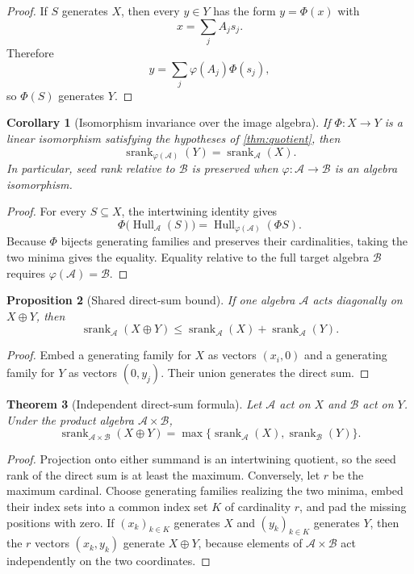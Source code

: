 \documentclass[11pt]{article}
\newtheorem{theorem}{Theorem}[section]
\newtheorem{proposition}[theorem]{Proposition}
\newtheorem{corollary}[theorem]{Corollary}
\theoremstyle{definition}
\theoremstyle{remark}
\newcommand{\cA}{\mathcal A}
\newcommand{\cB}{\mathcal B}
\newcommand{\Hull}{\operatorname{Hull}}
\newcommand{\srank}{\operatorname{srank}}
\begin{document}
\begin{proof}
If $S$ generates $X$, then every $y\in Y$ has the form $y=\Phi(x)$ with
\[
x=\sum_j A_js_j.
\]
Therefore
\[
y=\sum_j\varphi(A_j)\Phi(s_j),
\]
so $\Phi(S)$ generates $Y$.
\end{proof}

\begin{corollary}[Isomorphism invariance over the image algebra]
\label{cor:image-algebra-invariance}
If $\Phi:X\to Y$ is a linear isomorphism satisfying the hypotheses of \cref{thm:quotient}, then
\[
\srank_{\varphi(\cA)}(Y)=\srank_{\cA}(X).
\]
In particular, seed rank relative to $\cB$ is preserved when $\varphi:\cA\to\cB$ is an algebra isomorphism.
\end{corollary}

\begin{proof}
For every $S\subseteq X$, the intertwining identity gives
\[
\Phi\bigl(\Hull_{\cA}(S)\bigr)
=
\Hull_{\varphi(\cA)}(\Phi S).
\]
Because $\Phi$ bijects generating families and preserves their cardinalities, taking the two minima gives the equality. Equality relative to the full target algebra $\cB$ requires $\varphi(\cA)=\cB$.
\end{proof}

\begin{proposition}[Shared direct-sum bound]
\label{prop:shared-direct-sum}
If one algebra $\cA$ acts diagonally on $X\oplus Y$, then
\[
\boxed{
\srank_{\cA}(X\oplus Y)
\le
\srank_{\cA}(X)+\srank_{\cA}(Y).
}
\]
\end{proposition}

\begin{proof}
Embed a generating family for $X$ as vectors $(x_i,0)$ and a generating family for $Y$ as vectors $(0,y_j)$. Their union generates the direct sum.
\end{proof}

\begin{theorem}[Independent direct-sum formula]
\label{thm:independent-direct-sum}
Let $\cA$ act on $X$ and $\cB$ act on $Y$. Under the product algebra $\cA\times\cB$,
\[
\boxed{
\srank_{\cA\times\cB}(X\oplus Y)
=
\max\{\srank_{\cA}(X),\srank_{\cB}(Y)\}.
}
\]
\end{theorem}

\begin{proof}
Projection onto either summand is an intertwining quotient, so the seed rank of the direct sum is at least the maximum. Conversely, let $r$ be the maximum cardinal. Choose generating families realizing the two minima, embed their index sets into a common index set $K$ of cardinality $r$, and pad the missing positions with zero. If $(x_k)_{k\in K}$ generates $X$ and $(y_k)_{k\in K}$ generates $Y$, then the $r$ vectors $(x_k,y_k)$ generate $X\oplus Y$, because elements of $\cA\times\cB$ act independently on the two coordinates.
\end{proof}
\end{document}
